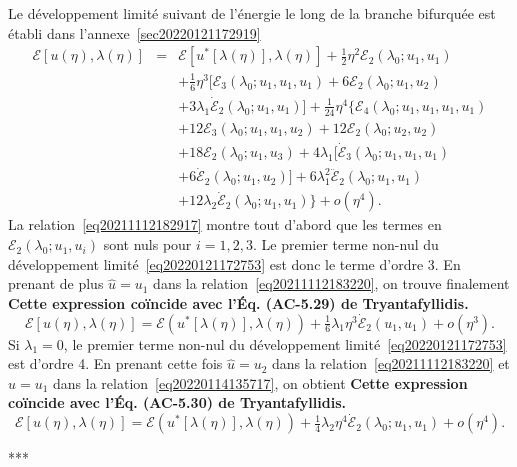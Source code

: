\documentclass[12pt, final]{amsart}
\begin{document}
Le développement limité suivant de l'énergie le long de la branche
bifurquée est établi dans l'annexe~\ref{sec20220121172919}
\begin{eqnarray}
  \mathcal{E} [u (\eta), \lambda (\eta)] & = & \mathcal{E} [u^{\ast} [\lambda
  (\eta)], \lambda (\eta)] + \tfrac{1}{2} \eta^2 \mathcal{E}_2 (\lambda_0 ;
  u_1, u_1) \nonumber\\
  &  & + \tfrac{1}{6} \eta^3  [\mathcal{E}_3 (\lambda_0 ; u_1, u_1, u_1) +
  6\mathcal{E}_2 (\lambda_0 ; u_1, u_2)  \nonumber\\
  &  &  + 3 \lambda_1  \dot{\mathcal{E}}_2 (\lambda_0 ; u_1, u_1)]
  + \tfrac{1}{24} \eta^4  \{ \mathcal{E}_4 (\lambda_0 ; u_1, u_1, u_1, u_1)
   \nonumber\\
  &  & + 12\mathcal{E}_3 (\lambda_0 ; u_1, u_1, u_2) + 12\mathcal{E}_2
  (\lambda_0 ; u_2, u_2) \nonumber\\
  &  & + 18\mathcal{E}_2 (\lambda_0 ; u_1, u_3) + 4 \lambda_1
  [\dot{\mathcal{E}}_3 (\lambda_0 ; u_1, u_1, u_1)  \nonumber\\
  &  &  + 6 \dot{\mathcal{E}}_2 (\lambda_0 ; u_1, u_2)] + 6
  \lambda_1^2  \ddot{\mathcal{E}}_2 (\lambda_0 ; u_1, u_1) \nonumber\\
  &  &  + 12 \lambda_2  \dot{\mathcal{E}}_2 (\lambda_0 ; u_1, u_1)
  \} + o (\eta^4) .  \label{eq20220121172753}
\end{eqnarray}
La relation~\eqref{eq20211112182917} montre tout d'abord que les termes en
$\mathcal{E}_2 (\lambda_0 ; u_1, u_i)$ sont nuls pour $i = 1, 2, 3$. Le
premier terme non-nul du développement limité~\eqref{eq20220121172753}
est donc le terme d'ordre 3. En prenant de plus $\hat{u} = u_1$ dans la
relation~\eqref{eq20211112183220}, on trouve finalement \textbf{Cette
expression co{\"i}ncide avec l'Éq. (AC-5.29) de Tryantafyllidis.}
\begin{equation}
  \mathcal{E} [u (\eta), \lambda (\eta)] =\mathcal{E} (u^{\ast} [\lambda
  (\eta)], \lambda (\eta)) + \tfrac{1}{6} \lambda_1 \eta^3
  \dot{\mathcal{E}}_2 (u_1, u_1) + o (\eta^3) .
\end{equation}
Si $\lambda_1 = 0$, le premier terme non-nul du développement
limité~\eqref{eq20220121172753} est d'ordre 4. En prenant cette fois
$\hat{u} = u_2$ dans la relation~\eqref{eq20211112183220} et $\hat{u} = u_1$
dans la relation~\eqref{eq20220114135717}, on obtient \textbf{Cette
expression co{\"i}ncide avec l'Éq. (AC-5.30) de Tryantafyllidis.}
\begin{equation}
  \mathcal{E} [u (\eta), \lambda (\eta)] =\mathcal{E} (u^{\ast} [\lambda
  (\eta)], \lambda (\eta)) + \tfrac{1}{4} \lambda_2 \eta^4
  \dot{\mathcal{E}}_2 (\lambda_0 ; u_1, u_1) + o (\eta^4) .
\end{equation}
\begin{center}
  ***
\end{center}
\end{document}
